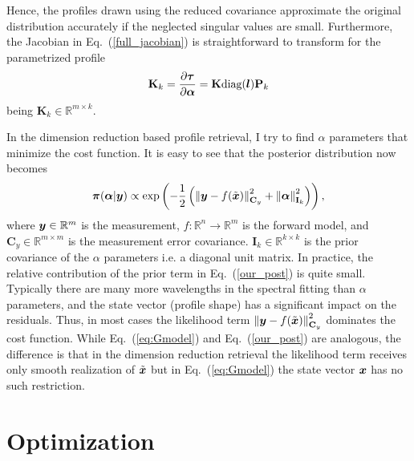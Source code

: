 \documentclass[12pt,a4paper]{article}
\newcommand*{\Rset}{\mathbb{R}}  %
\newcommand*{\norm}[1]{\left\lVert#1\right\rVert}
\newcommand{\mat}[1]{\mathbf{#1}}
\DeclareRobustCommand*{\vec}[1]{\ensuremath{
\mathchoice{\mbox{\boldmath$\displaystyle#1$}}
           {\mbox{\boldmath$\textstyle#1$}}
           {\mbox{\boldmath$\scriptstyle#1$}}
           {\mbox{\boldmath$\scriptscriptstyle#1$}}}}
\begin{document}
Hence, the profiles drawn using the reduced covariance approximate
the original distribution accurately if the neglected singular values are small.
Furthermore, the Jacobian in Eq.~(\ref{full_jacobian})
is straightforward to transform for the parametrized profile
\begin{equation}
  \mat{K}_k=\frac{\partial\vec{\tau}}{\partial\vec{\alpha}}=\mat{K}\text{diag}(\vec{l})\mat{P}_k
  \label{eq:dimred_jac}
\end{equation}
being $\mat{K}_k \in \Rset^{m \times k}$.

In the dimension reduction based profile retrieval, I try to find $\alpha$ parameters
that minimize the cost function. It is easy to see that the posterior distribution now becomes
\begin{align}
  \label{our_post}
  \vec{\pi}(\vec{\alpha}|\vec{y}) \propto \exp\left(-\frac{1}{2}\left(\norm{\vec{y}-f(\tilde{\vec{x}})}_{\mat{C}_y}^2 + \norm{\vec{\alpha}}_{\mat{I}_k}^2\right)\right),
\end{align}
where $\vec{y} \in \Rset^m $ is the measurement,
$f \colon \Rset^n \to \Rset^m$ is the forward model, and
$\mat{C}_y \in \Rset^{m \times m}$ is the measurement error covariance.
$\mat{I}_k \in \Rset^{k \times k}$ is the prior covariance of the $\alpha$ parameters i.e.
a diagonal unit matrix.
In practice, the relative contribution of the prior term in Eq.~(\ref{our_post}) is quite small.
Typically there are many more wavelengths in the spectral fitting
than $\alpha$ parameters, and the state vector (profile shape) has a significant
impact on the residuals. Thus, in most cases the likelihood term $\norm{\vec{y}-f(\tilde{\vec{x}})}_{\mat{C}_y}^2$ dominates the cost function.
While Eq.~(\ref{eq:Gmodel}) and Eq.~(\ref{our_post}) are analogous, the difference
is that in the dimension reduction retrieval the likelihood term
receives only smooth realization of $\tilde{\vec{x}}$ but in Eq.~(\ref{eq:Gmodel}) the state
vector $\vec{x}$ has no such restriction.

\section{Optimization}
\end{document}
